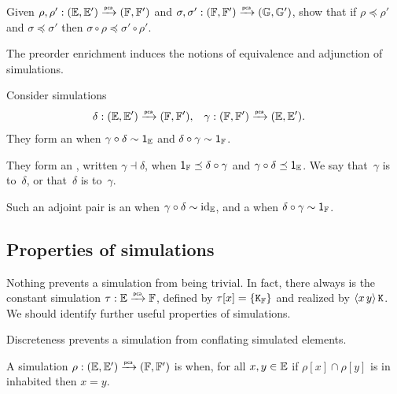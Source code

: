 \begin{exercise}
  Given $\rho, \rho' : (\EE, \subEE) \pcato (\FF, \subFF)$ and $\sigma, \sigma' : (\FF, \subFF) \pcato (\GG, \subGG)$, show that if $\rho \preceq \rho'$ and $\sigma \preceq \sigma'$ then $\sigma \circ \rho \preceq \sigma' \circ \rho'$.
\end{exercise}

The preorder enrichment induces the notions of equivalence and adjunction of simulations.

\goodbreak

\begin{definition}%
  Consider simulations
  \begin{align*}
    \delta &: (\EE, \subEE) \pcato (\FF, \subFF),
    &
    \gamma &: (\FF, \subFF) \pcato (\EE, \subEE).
  \end{align*}
  They form an  when $\gamma \circ \delta \sim \one_\EE$ and $\delta \circ \gamma \sim \one_\FF$.

  They form an , written $\gamma \dashv \delta$, when
  $\one_{\FF} \preceq \delta \circ \gamma$ and $\gamma \circ
  \delta \preceq \one_{\EE}$. We say that~$\gamma$ is  to~$\delta$, or that~$\delta$ is 
  to~$\gamma$.

  Such an adjoint pair is an  when $\gamma \circ \delta \sim \id[\EE]$, and a
   when $\delta \circ \gamma \sim \one_\FF$.
\end{definition}

\subsection{Properties of simulations}
\label{sec:prop-simul}

Nothing prevents a simulation from being trivial. In fact, there always is the constant simulation $\tau : \EE \pcato \FF$, defined by $\tau[x] = \set{\combK_{\FF}}$ and realized by $\pcalam{x\,y} \combK$. We should identify further useful properties of simulations.

Discreteness prevents a simulation from conflating simulated elements.

\begin{definition}
  A simulation $\rho: (\EE, \subEE) \pcato (\FF, \subFF)$ is
   when, for all $x, y \in \EE$ if $\rho[x] \cap \rho[y]$ is in inhabited then $x = y$.
\end{definition}

